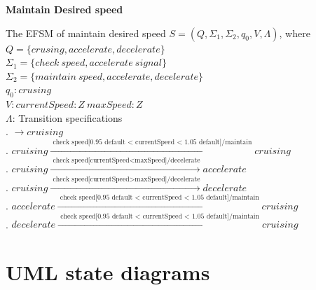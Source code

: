 \documentclass[12pt]{article}
\begin{document}
\begin{spacing}{1.5}
\newpage
\noindent \textbf{Maintain Desired speed}

\noindent The EFSM of maintain desired speed $S = (Q, \Sigma_1, \Sigma_2, q_0, V, \Lambda)$, where\\

\noindent $Q = \{crusing,accelerate,decelerate\}$\\
\noindent $\Sigma_1 = \{check~speed,accelerate~signal\}$\\
\noindent $\Sigma_2 = \{maintain~speed,accelerate,decelerate\}$\\
\noindent $q_0: crusing$\\
\noindent $V: currentSpeed:Z~maxSpeed:Z$\\
\noindent $\Lambda$: Transition specifications\\
. $\rightarrow cruising$\\
. $cruising \xrightarrow {\text { check~speed[0.95 default < currentSpeed < 1.05 default]/maintain}} cruising$\\
. $cruising \xrightarrow {\text { check~speed[currentSpeed<maxSpeed]/decelerate}} accelerate$\\
. $cruising \xrightarrow {\text { check~speed[currentSpeed>maxSpeed]/decelerate}} decelerate$\\
. $accelerate \xrightarrow {\text { check~speed[0.95 default < currentSpeed < 1.05 default]/maintain}} cruising$\\
. $decelerate \xrightarrow {\text { check~speed[0.95 default < currentSpeed < 1.05 default]/maintain}} cruising$\\

\newpage

\section{UML state diagrams}


\end{spacing}
\end{document}
